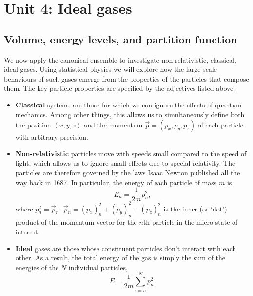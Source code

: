 \renewcommand{\thisunit}{MATH327 Unit 4}
\renewcommand{\moddate}{Last modified 26 Jan.~2023}
\setcounter{section}{4}
\setcounter{subsection}{0}
{}
\section*{Unit 4: Ideal gases}
\subsection{\label{sec:regulate}Volume, energy levels, and partition function}
We now apply the canonical ensemble to investigate non-relativistic, classical, ideal gases.
Using statistical physics we will explore how the large-scale behaviours of such gases emerge from the properties of the particles that compose them.
The key particle properties are specified by the adjectives listed above: \\[-24 pt]
\begin{itemize}
  \item \textbf{Classical} systems are those for which we can ignore the effects of quantum mechanics.
        Among other things, this allows us to simultaneously define both the position $(x, y, z)$ and the momentum $\vec p = (p_x, p_y, p_z)$ of each particle with arbitrary precision. %
  \item \textbf{Non-relativistic} particles move with speeds small compared to the speed of light, which allows us to ignore small effects due to special relativity.
        The particles are therefore governed by the laws Isaac Newton published all the way back in 1687.
        In particular, the energy of each particle of mass $m$ is
        \begin{equation*}
          E_n = \frac{1}{2m} p_n^2,
        \end{equation*}
        where $p_n^2 = \vec p_n \cdot \vec p_n = (p_x)_n^2 + (p_y)_n^2 + (p_z)_n^2$ is the inner (or `dot') product of the momentum vector for the $n$th particle in the micro-state of interest.
  \item \textbf{Ideal} gases are those whose constituent particles don't interact with each other.
        As a result, the total energy of the gas is simply the sum of the energies of the $N$ individual particles,
        \begin{equation}
          \label{eq:momentum}
          E = \frac{1}{2m} \sum_{i = n}^N p_n^2.
        \end{equation}
\end{itemize}

